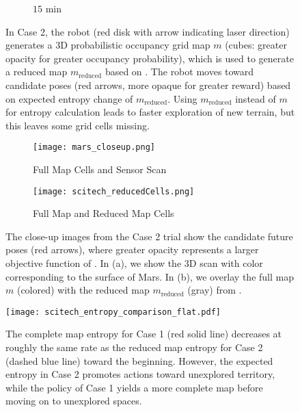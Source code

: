 \begin{figure}[!t]
\begin{subfigure}[t]{0.49\columnwidth}
        		\caption{$15$ min}
		\vspace*{0.025\textwidth}
    	\end{subfigure}
\caption{In Case 2, the robot (red disk with arrow indicating laser direction) generates a 3D probabilistic occupancy grid map $m$ (cubes: greater opacity for greater occupancy probability), which is used to generate a reduced map $m_\text{reduced}$ based on . The robot moves toward candidate poses (red arrows, more opaque for greater reward) based on expected entropy change of $m_\text{reduced}$. Using $m_\text{reduced}$ instead of $m$ for entropy calculation leads to faster exploration of new terrain, but this leaves some grid cells missing.}
\label{fig:mars3DogmCase2}
\end{figure}

\begin{figure}[!t]
	\centering
	\begin{subfigure}[t]{0.95\columnwidth}
           	\centering
          	\texttt{[image: mars\_closeup.png]}
        		\caption{Full Map Cells and Sensor Scan}
		\vspace*{0.025\textwidth}
    	\end{subfigure}
	\centering
	\begin{subfigure}[t]{0.95\columnwidth}
           	\centering
          	\texttt{[image: scitech\_reducedCells.png]}
        		\caption{Full Map and Reduced Map Cells}
		\vspace*{0.025\textwidth}
    	\end{subfigure}
\caption{The close-up images from the Case 2 trial show the candidate future poses (red arrows), where greater opacity represents a larger objective function of . In (a), we show the 3D scan with color corresponding to the surface of Mars. In (b), we overlay the full map $m$ (colored) with the reduced map $m_\text{reduced}$ (gray) from .}
\label{fig:marsZoomedIn}
\end{figure}


	\begin{figure}
		\centerline{
			\texttt{[image: scitech\_entropy\_comparison\_flat.pdf]}
		}
		\caption{The complete map entropy for Case 1 (red solid line) decreases at roughly the same rate as the reduced map entropy for Case 2 (dashed blue line) toward the beginning. However, the expected entropy in Case 2 promotes actions toward unexplored territory, while the policy of Case 1 yields a more complete map before moving on to unexplored spaces.}
		\label{fig:mars3Dentropy}
	\end{figure}


